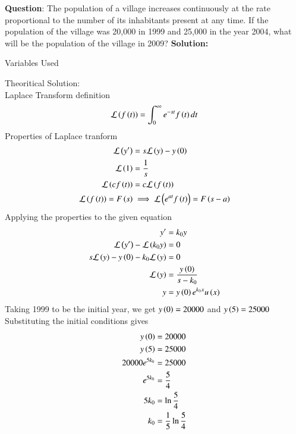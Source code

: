\documentclass[journal]{IEEEtran}
\begin{document}
\textbf{Question}:\newline
The population of a village increases continuously at the rate proportional to the
number of its inhabitants present at any time. If the population of the village was
20,000 in 1999 and 25,000 in the year 2004, what will be the population of the
village in 2009?
\newline
\textbf{Solution: }
\begin{table}[h!]    
  \centering
  
  \caption{Variables Used}
  \label{tab1.1.2.2}
\end{table}
\newline
Theoritical Solution:\\
Laplace Transform definition\\
\begin{align}
	\mathcal{L}\left(f\left(t\right)\right) = \int_{0}^{\infty}e^{-st}f\left(t\right)dt
\end{align}
Properties of Laplace tranform
\begin{align}
	\mathcal{L}\left(y^{\prime}\right) &= s\mathcal{L}\left(y\right) -y\left(0\right)\\
	\mathcal{L}\left(1\right) &= \frac{1}{s}\\
	\mathcal{L}\left(cf\left(t\right)\right) &= c\mathcal{L}\left(f\left(t\right)\right)\\
	\mathcal{L}\left(f\left(t\right)\right) = F\left(s\right) &\implies \mathcal{L}\left(e^{at}f\left(t\right)\right) = F\left(s-a\right)	
\end{align}
Applying the properties to the given equation
\begin{align}
	y^{\prime} &= k_{0}y\\
	\mathcal{L}\left(y^\prime\right) - \mathcal{L}\left(k_{0}y\right)&= 0\\
	s\mathcal{L}\left(y\right) - y\left(0\right) - k_{0}\mathcal{L}\left(y\right) &= 0\\
	\mathcal{L}\left(y\right) &= \frac{y\left(0\right)}{s - k_{0}}\\
	y &= y\left(0\right)e^{k_{0}x}u\left(x\right)
\end{align}
Taking 1999 to be the initial year, we get $y\left(0\right) = 20000$ and $y\left(5\right) = 25000$\\
Substituting the initial conditions gives
\begin{align}
	y\left(0\right) &= 20000\\
	y\left(5\right) &= 25000\\
	20000e^{5k_{0}} &= 25000\\
	e^{5k_{0}} &= \frac{5}{4}\\
	5k_{0} &= \ln{\frac{5}{4}}\\
	k_{0} &= \frac{1}{5}\ln{\frac{5}{4}}
\end{align}
\end{document}
